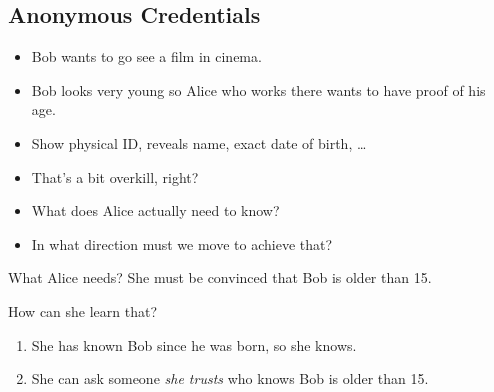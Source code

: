 \subsection{Anonymous Credentials}

\begin{frame}
  \begin{example}
    \begin{itemize}
      \item Bob wants to go see a film in cinema.
      \item Bob looks very young so Alice who works there wants to have proof 
        of his age.

        \pause{}

      \item Show physical ID, reveals name, exact date of birth, \dots
    \end{itemize}
  \end{example}

  \pause{}

  \begin{exercise}
    \begin{itemize}
      \item That's a bit overkill, right?
      \item What does Alice actually need to know?
      \item In what direction must we move to achieve that?
    \end{itemize}
  \end{exercise}
\end{frame}

\begin{frame}
  \begin{block}{What Alice needs?}
    She must be convinced that Bob is older than 15.
  \end{block}

  \pause{}

  \begin{alertblock}{How can she learn that?}
    \begin{enumerate}
      \item She has known Bob since he was born, so she knows.

        \pause{}

      \item She can ask someone \emph{she trusts} who knows Bob is older than 
        15.
    \end{enumerate}
  \end{alertblock}
\end{frame}

